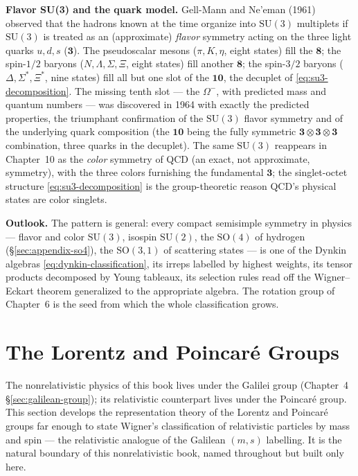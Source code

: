 \medskip\noindent\textbf{Flavor SU(3) and the quark model.} Gell-Mann and Ne'eman (1961) observed that the hadrons known at the time organize into $\mathrm{SU}(3)$ multiplets if $\mathrm{SU}(3)$ is treated as an (approximate) \emph{flavor} symmetry acting on the three light quarks $u,d,s$ ($\mathbf{3}$). The pseudoscalar mesons ($\pi,K,\eta$, eight states) fill the $\mathbf{8}$; the spin-$1/2$ baryons ($N,\Lambda,\Sigma,\Xi$, eight states) fill another $\mathbf{8}$; the spin-$3/2$ baryons ($\Delta,\Sigma^{*},\Xi^{*}$, nine states) fill all but one slot of the $\mathbf{10}$, the decuplet of \eqref{eq:su3-decomposition}. The missing tenth slot --- the $\Omega^{-}$, with predicted mass and quantum numbers --- was discovered in 1964 with exactly the predicted properties, the triumphant confirmation of the $\mathrm{SU}(3)$ flavor symmetry and of the underlying quark composition (the $\mathbf{10}$ being the fully symmetric $\mathbf{3}\otimes\mathbf{3}\otimes\mathbf{3}$ combination, three quarks in the decuplet). The same $\mathrm{SU}(3)$ reappears in Chapter~10 as the \emph{color} symmetry of QCD (an exact, not approximate, symmetry), with the three colors furnishing the fundamental $\mathbf{3}$; the singlet-octet structure \eqref{eq:su3-decomposition} is the group-theoretic reason QCD's physical states are color singlets.

\medskip\noindent\textbf{Outlook.} The pattern is general: every compact semisimple symmetry in physics --- flavor and color $\mathrm{SU}(3)$, isospin $\mathrm{SU}(2)$, the $\mathrm{SO}(4)$ of hydrogen (\S\ref{sec:appendix-so4}), the $\mathrm{SO}(3,1)$ of scattering states --- is one of the Dynkin algebras \eqref{eq:dynkin-classification}, its irreps labelled by highest weights, its tensor products decomposed by Young tableaux, its selection rules read off the Wigner--Eckart theorem generalized to the appropriate algebra. The rotation group of Chapter~6 is the seed from which the whole classification grows.

\section{The Lorentz and Poincar\'e Groups}
\label{sec:appendix-lorentz}

The nonrelativistic physics of this book lives under the Galilei group (Chapter~4 \S\ref{sec:galilean-group}); its relativistic counterpart lives under the Poincar\'e group. This section develops the representation theory of the Lorentz and Poincar\'e groups far enough to state Wigner's classification of relativistic particles by mass and spin --- the relativistic analogue of the Galilean $(m,s)$ labelling. It is the natural boundary of this nonrelativistic book, named throughout but built only here.

